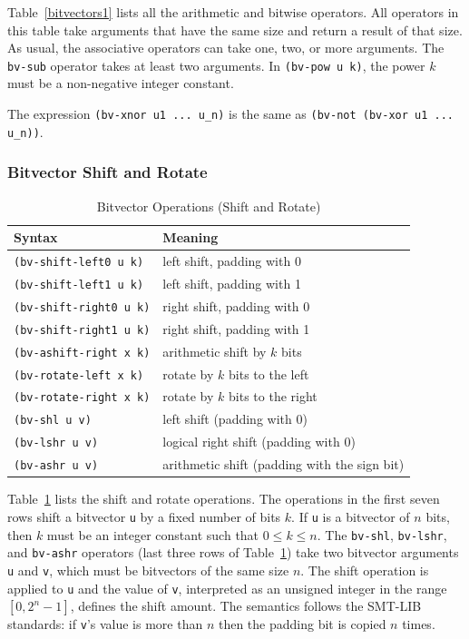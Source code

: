 \documentclass[11pt,twoside,fleqn,openright,titlepage]{cslreport}
\begin{document}
Table~\ref{bitvectors1} lists all the arithmetic and bitwise
operators. All operators in this table take arguments that have the
same size and return a result of that size.  As usual, the associative
operators can take one, two, or more arguments. The \texttt{bv-sub}
operator takes at least two arguments. In \texttt{(bv-pow u k)},
the power $k$ must be a non-negative integer constant.

\medskip\noindent
The expression \texttt{(bv-xnor u1 ... u\_n)} is the same as
\texttt{(bv-not (bv-xor u1 ... u\_n))}.

\subsubsection*{Bitvector Shift and Rotate}

\begin{table}
\begin{small}
\begin{center}
\begin{tabular}{|p{5cm}|l|}
\hline
Syntax & Meaning \\
\hline
\texttt{(bv-shift-left0 u k)} & left shift, padding with 0\\
\texttt{(bv-shift-left1 u k)} & left shift, padding with 1\\
\texttt{(bv-shift-right0 u k)} & right shift, padding with 0\\
\texttt{(bv-shift-right1 u k)} & right shift, padding with 1\\
\texttt{(bv-ashift-right x k)} &  arithmetic shift by $k$ bits\\
\texttt{(bv-rotate-left x k)} & rotate by $k$ bits to the left\\
\texttt{(bv-rotate-right x k)} & rotate by $k$ bits to the right\\
\hline
\texttt{(bv-shl u v)} & left shift (padding with 0)\\
\texttt{(bv-lshr u v)} & logical right shift (padding with 0) \\
\texttt{(bv-ashr u v)} & arithmetic shift (padding with the sign bit)\\
\hline
\end{tabular}
\end{center}
\end{small}
\caption{Bitvector Operations (Shift and Rotate)}
\label{bitvectors2}
\end{table}

Table~\ref{bitvectors2} lists the shift and rotate operations. The
operations in the first seven rows shift a bitvector \texttt{u} by a
fixed number of bits $k$. If \texttt{u} is a bitvector of $n$ bits,
then $k$ must be an integer constant such that $0 \leq k \leq n$. The
\texttt{bv-shl}, \texttt{bv-lshr}, and \texttt{bv-ashr} operators
(last three rows of Table~\ref{bitvectors2}) take two bitvector
arguments \texttt{u} and \texttt{v}, which must be bitvectors of the
same size $n$. The shift operation is applied to \texttt{u} and the
value of \texttt{v}, interpreted as an unsigned integer in the range
$[0, 2^n-1]$, defines the shift amount. The semantics follows the
SMT-LIB standards: if \texttt{v}'s value is more than $n$ then the
padding bit is copied $n$ times.
\end{document}
